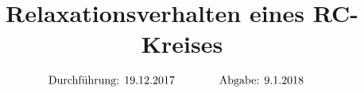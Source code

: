 

\subject{V353}
\title{Relaxationsverhalten eines RC-Kreises}

\date{
  \begin{align}
    \text{Durchführung: } & \text{19.12.2017} & \hspace{3em} & \text{Abgabe: 9.1.2018} \notag
  \end{align}
}




\maketitle
\thispagestyle{empty}
\tableofcontents
\newpage






\printbibliography{}


